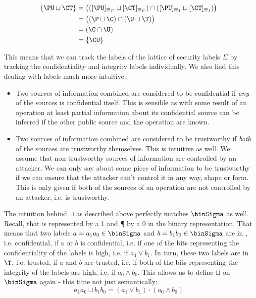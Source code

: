 \begin{example}
    \begin{align*}
        \{ \PU \sqcup \CT \} &= \big(([\PU]_{\equiv_C} \sqcup [\CT]_{\equiv_C}) \cap ([\PU]_{\equiv_I} \sqcup [\CT]_{\equiv_I}) \big) \\
        &= \big((\P \sqcup \C) \cap (\U \sqcup \T) \big) \\
        &= (\C \cap \U) \\
        &= \{ \CU \}
    \end{align*}
\end{example}

This means that we can track the labels of the lattice of security labels $ \Sigma $ by tracking the confidentiality and integrity labels individually.
We also find this dealing with labels much more intuitive:
\begin{itemize}
    \item Two sources of information combined are considered to be confidential if \textit{any} of the sources is confidential itself.
    This is sensible as with some result of an operation at least partial information about its confidential source can be inferred if the other public source and the operation are known.
    \item Two sources of information combined are considered to be trustworthy if \textit{both} of the sources are trustworthy themselves.
    This is intuitive as well.
    We assume that non-trustworthy sources of information are controlled by an attacker.
    We can only say about some piece of information to be trustworthy if we can ensure that the attacker can't control it in any way, shape or form.
    This is only given if both of the sources of an operation are not controlled by an attacker, i.e. is trustworthy.
\end{itemize}

The intuition behind $ \sqcup $ as described above perfectly matches $ \binSigma $ as well.
Recall, that \C{} is represented by a 1 and \P{} by a 0 in the binary representation.
That means that two labels $ a = a_1a_0 \in \binSigma $ and $ b = b_1b_0 \in \binSigma $ are in \C{}, i.e. confidential, if $ a $ or $ b $ is confidential, i.e. if one of the bits representing the confidentiality of the labels is high, i.e. if $ a_1 \lor b_1 $.
In turn, these two labels are in $ \T $, i.e. trusted, if $ a $ and $ b $ are trusted, i.e. if both of the bits representing the integrity of the labels are high, i.e. if $ a_0 \land b_0 $.
This allows us to define $ \sqcup $ on $ \binSigma $ again - this time not just semantically:
\begin{equation*}
    a_1a_0 \sqcup b_1b_0 = (a_1 \lor b_1) \cdot (a_0 \land b_0)
\end{equation*}

